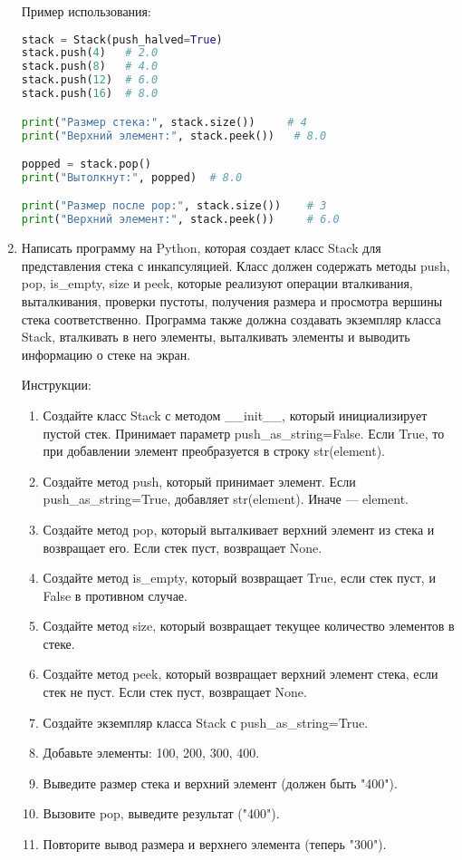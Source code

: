 \begin{enumerate}
Пример использования:
\begin{lstlisting}[language=Python]
stack = Stack(push_halved=True)
stack.push(4)   # 2.0
stack.push(8)   # 4.0
stack.push(12)  # 6.0
stack.push(16)  # 8.0

print("Размер стека:", stack.size())     # 4
print("Верхний элемент:", stack.peek())   # 8.0

popped = stack.pop()
print("Вытолкнут:", popped)  # 8.0

print("Размер после pop:", stack.size())    # 3
print("Верхний элемент:", stack.peek())     # 6.0
\end{lstlisting}

\item Написать программу на Python, которая создает класс Stack для представления стека с инкапсуляцией. Класс должен содержать методы push, pop, is\_empty, size и peek, которые реализуют операции вталкивания, выталкивания, проверки пустоты, получения размера и просмотра вершины стека соответственно. Программа также должна создавать экземпляр класса Stack, вталкивать в него элементы, выталкивать элементы и выводить информацию о стеке на экран.

Инструкции:
\begin{enumerate}
    \item Создайте класс Stack с методом \_\_init\_\_, который инициализирует пустой стек. Принимает параметр push\_as\_string=False. Если True, то при добавлении элемент преобразуется в строку str(element).
    \item Создайте метод push, который принимает элемент. Если push\_as\_string=True, добавляет str(element). Иначе — element.
    \item Создайте метод pop, который выталкивает верхний элемент из стека и возвращает его. Если стек пуст, возвращает None.
    \item Создайте метод is\_empty, который возвращает True, если стек пуст, и False в противном случае.
    \item Создайте метод size, который возвращает текущее количество элементов в стеке.
    \item Создайте метод peek, который возвращает верхний элемент стека, если стек не пуст. Если стек пуст, возвращает None.
    \item Создайте экземпляр класса Stack с push\_as\_string=True.
    \item Добавьте элементы: 100, 200, 300, 400.
    \item Выведите размер стека и верхний элемент (должен быть "400").
    \item Вызовите pop, выведите результат ("400").
    \item Повторите вывод размера и верхнего элемента (теперь "300").
\end{enumerate}


\end{enumerate}
